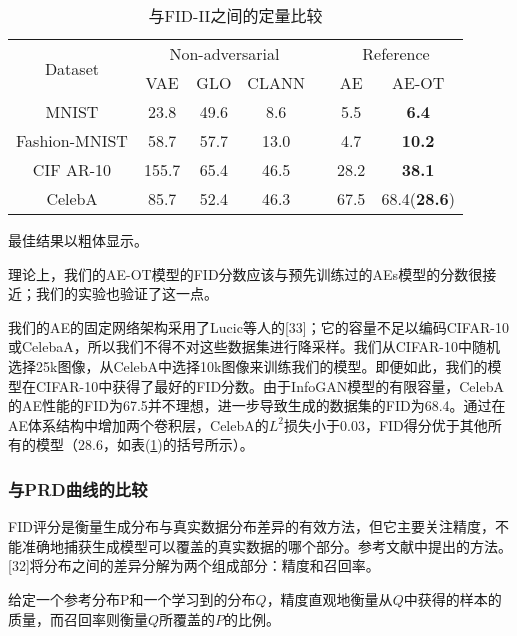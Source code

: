 \begin{table}[!htbp]
	\caption{与FID-II之间的定量比较}
	\label{table:4}
	\centering
	\begin{tabular}{@{}ccccccc@{}}
		\cmidrule(r){1-7}
		\multirow{2}{*}{Dataset} & \multicolumn{3}{c}{Non-adversarial} &  & \multicolumn{2}{c}{Reference} \\ \cmidrule(lr){2-4} \cmidrule(l){6-7} 
		& VAE        & GLO       & CLANN      &  & AE        & AE-OT             \\ \cmidrule(r){1-7}
		MNIST                    & 23.8       & 49.6      & 8.6        &  & 5.5       & \textbf{6.4}      \\
		Fashion-MNIST            & 58.7       & 57.7      & 13.0       &  & 4.7       & \textbf{10.2}     \\
		CIF AR-10                & 155.7      & 65.4      & 46.5       &  & 28.2      & \textbf{38.1}     \\
		CelebA                   & 85.7       & 52.4      & 46.3       &  & 67.5      & 68.4(\textbf{28.6})        \\ \cmidrule(r){1-7}
	\end{tabular}
\end{table}

最佳结果以粗体显示。

理论上，我们的AE-OT模型的FID分数应该与预先训练过的AEs模型的分数很接近；我们的实验也验证了这一点。

我们的AE的固定网络架构采用了Lucic等人的[33]；它的容量不足以编码CIFAR-10或CelebaA，所以我们不得不对这些数据集进行降采样。我们从CIFAR-10中随机选择25k图像，从CelebA中选择10k图像来训练我们的模型。即便如此，我们的模型在CIFAR-10中获得了最好的FID分数。由于InfoGAN模型的有限容量，CelebA的AE性能的FID为67.5并不理想，进一步导致生成的数据集的FID为68.4。通过在AE体系结构中增加两个卷积层，CelebA的$L^2$损失小于$0.03$，FID得分优于其他所有的模型（$28.6$，如表(\ref{table:4})的括号所示）。

\subsubsection{与PRD曲线的比较}

FID评分是衡量生成分布与真实数据分布差异的有效方法，但它主要关注精度，不能准确地捕获生成模型可以覆盖的真实数据的哪个部分。参考文献中提出的方法。[32]将分布之间的差异分解为两个组成部分：精度和召回率。

给定一个参考分布P和一个学习到的分布$Q$，精度直观地衡量从$Q$中获得的样本的质量，而召回率则衡量$Q$所覆盖的$P$的比例。

